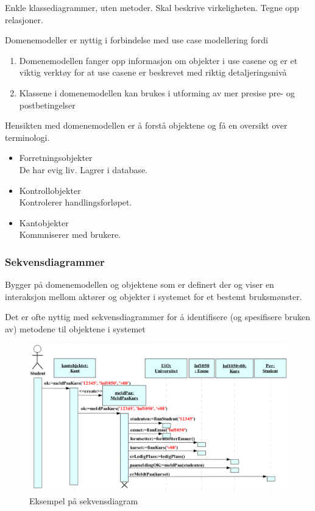 \documentclass[11pt]{article}
\begin{document}
    Enkle klassediagrammer, uten metoder. Skal beskrive virkeligheten. Tegne opp relasjoner.

    Domenemodeller er nyttig i forbindelse med use case modellering fordi
\begin{enumerate}
\item Domenemodellen fanger opp informasjon om objekter i use casene og er
       et viktig verktøy for at use casene er beskrevet med riktig detaljeringsnivå
\item Klassene i domenemodellen kan brukes i utforming av mer presise pre- og postbetingelser
\end{enumerate}

    Hensikten med domenemodellen er å forstå objektene og få en oversikt over terminologi.
\begin{itemize}

\item Forretningsobjekter\\
\label{sec-7.4.1.1}%
De har evig liv. Lagrer i database.

\item Kontrollobjekter\\
\label{sec-7.4.1.2}%
Kontrolerer handlingsforløpet.

\item Kantobjekter\\
\label{sec-7.4.1.3}%
Kommniserer med brukere.

\end{itemize} %
\subsubsection{Sekvensdiagrammer}
\label{sec-7.4.2}

    Bygger på domenemodellen og objektene som er definert der
    og viser en interaksjon mellom aktører og objekter i systemet for
    et bestemt bruksmønster.
    
    Det er ofte nyttig med sekvensdiagrammer for å identifisere (og
    spesifisere bruken av) metodene til objektene i systemet

    \begin{figure}[htb]
    \centering
    \includegraphics[width=\textwidth]{./sekvensdiagram.eps}
    \caption{\label{fig:sekvensdiagram}Eksempel på sekvensdiagram}
    \end{figure}
\end{document}
